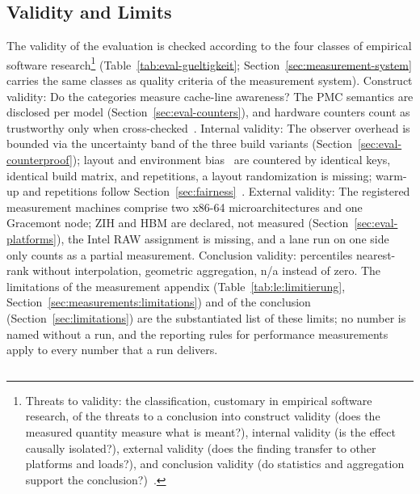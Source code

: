 \begin{nurlang}
\subsection{Validity and Limits}\label{sec:eval-validity}
The validity of the evaluation is checked according to the four classes of empirical software
research\footnote{Threats to validity: the classification, customary in empirical software research,
of the threats to a conclusion into construct validity (does the measured quantity measure what is
meant?), internal validity (is the effect causally isolated?), external validity (does the finding
transfer to other platforms and loads?), and conclusion validity (do statistics and aggregation
support the conclusion?)~\cite{wohlin2012experimentation}.} (Table~\ref{tab:eval-gueltigkeit};
Section~\ref{sec:measurement-system} carries the same classes as quality criteria of the measurement
system). Construct validity: Do the categories measure cache-line awareness? The PMC semantics are
disclosed per model (Section~\ref{sec:eval-counters}), and hardware counters count as trustworthy
only when cross-checked~\cite{weaver2008counters}. Internal validity: The observer overhead is
bounded via the uncertainty band of the three build variants (Section~\ref{sec:eval-counterproof});
layout and environment bias~\cite{mytkowicz2009wrongdata,curtsinger2013stabilizer} are countered by
identical keys, identical build matrix, and repetitions, a layout randomization is missing; warm-up
and repetitions follow Section~\ref{sec:fairness}~\cite{kalibera2013rigorous}. External validity: The
registered measurement machines comprise two x86-64 microarchitectures and one Gracemont node; ZIH
and HBM are declared, not measured (Section~\ref{sec:eval-platforms}), the Intel RAW assignment is
missing, and a lane run on one side only counts as a partial measurement. Conclusion validity:
percentiles nearest-rank without interpolation, geometric aggregation, n/a instead of zero. The
limitations of the measurement appendix (Table~\ref{tab:le:limitierung},
Section~\ref{sec:measurements:limitations}) and of the conclusion (Section~\ref{sec:limitations}) are
the substantiated list of these limits; no number is named without a run, and the reporting rules for
performance measurements~\cite{hoefler2015benchmarking,blackburn2016truth} apply to every number that
a run delivers.
\begin{table}[htbp]\centering\footnotesize
\begin{tabular}{@{}>{\raggedright\arraybackslash}p{1.6cm}>{\raggedright\arraybackslash}p{4.0cm}>{\raggedright\arraybackslash}p{4.9cm}>{\raggedright\arraybackslash}p{3.7cm}@{}}

\end{tabular}
\end{table}
\end{nurlang}
